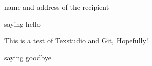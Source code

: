 \documentclass[10pt,a4paper]{letter}
\begin{document}
 
	\begin{letter}{name and address of the recipient} 
		\opening{saying hello} 
		
		This is a test of Texstudio and Git, Hopefully!
		
		\closing{saying goodbye} 
	\end{letter} 
\end{document}
